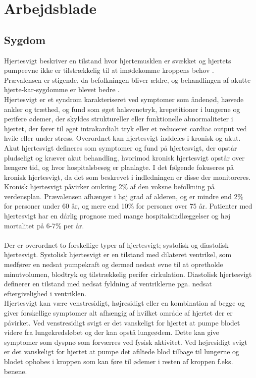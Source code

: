 \chapter{Arbejdsblade}

\section{Sygdom}\label{symp}
Hjertesvigt beskriver en tilstand hvor hjertemusklen er svækket og hjertets pumpeevne ikke er tilstrækkelig til at imødekomme kroppens behov \citep{TSchroeder20160}. Prævalensen er stigende, da befolkningen bliver ældre, og behandlingen af akutte hjerte-kar-sygdomme er blevet bedre \citep{heartfailure}.\\
Hjertesvigt er et syndrom karakteriseret ved symptomer som åndenød, hævede ankler og træthed, og fund som øget halsvenetryk, krepetitioner i lungerne og perifere ødemer, der skyldes struktureller eller funktionelle abnormaliteter i hjertet, der fører til øget intrakardialt tryk eller et reduceret cardiac output ved hvile eller under stress. Overordnet kan hjertesvigt inddeles i kronisk og akut. Akut hjertesvigt defineres som symptomer og fund på hjertesvigt, der opstår pludseligt og kræver akut behandling, hvorimod kronisk hjertesvigt opstår over længere tid, og hvor hospitalsbesøg er planlagte. I det følgende fokuseres på kronisk hjertesvigt, da det som beskrevet i indledningen er disse der monitoreres.\citep{heartfailure}\\
Kronisk hjertesvigt påvirker omkring 2\% af den voksne befolkning på verdensplan. Prævalensen afhænger i høj grad af alderen, og er mindre end 2\% for personer under 60 år, og mere end 10\% for personer over 75 år. Patienter med hjertesvigt har en dårlig prognose med mange hospitalsindlæggelser og høj mortalitet på 6-7\% per år.\citep{heartfailure}\\
\\
Der er overordnet to forskellige typer af hjertesvigt; systolisk og diastolisk hjertesvigt. Systolisk hjertesvigt er en tilstand med dilateret ventrikel, som medfører en nedsat pumpekraft og dermed nedsat evne til at opretholde minutvolumen, blodtryk og tilstrækkelig perifer cirkulation. Diastolisk hjertesvigt definerer en tilstand med nedsat fyldning af ventriklerne pga. nedsat eftergivelighed i ventriklen.\citep{TSchroeder2016}\\
Hjertesvigt kan være venstresidigt, højresidigt eller en kombination af begge og giver forskellige symptomer alt afhængig af hvilket område af hjertet der er påvirket. Ved venstresidigt svigt er det vanskeligt for hjertet at pumpe blodet videre fra lungekredsløbet og der kan opstå lungeødem. Dette kan give symptomer som dyspnø som forværres ved fysisk aktivitet. Ved højresidigt svigt er det vanskeligt for hjertet at pumpe det afiltede blod tilbage til lungerne og blodet ophobes i kroppen som kan føre til ødemer i resten af kroppen f.eks. benene. \cite{TSchroeder2016}\\
